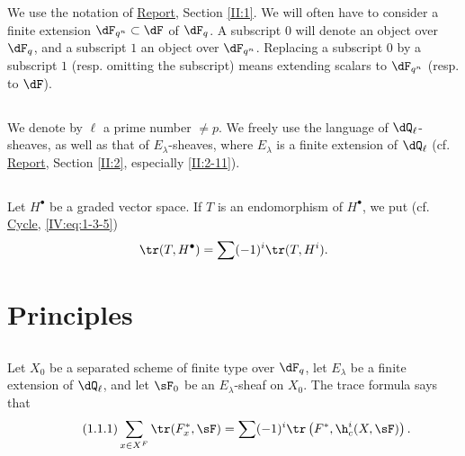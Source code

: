 We use the notation of \hyperref[II]{Report}, Section \ref{II:1}. We 
will often have to consider a finite extension $\dF_{q^n}\subset \dF$ of 
$\dF_q$. A subscript $0$ will denote an object over $\dF_q$, and a subscript $1$ 
an object over $\dF_{q^n}$. Replacing a subscript $0$ by a subscript $1$ (resp. 
omitting the subscript) means extending scalars to $\dF_{q^n}$ (resp. 
to $\dF$).





\subsection{}\label{VI:0-2}

We denote by $\ell$ a prime number $\ne p$. We freely use the 
language of $\dQ_\ell$-sheaves, as well as that of $E_\lambda$-sheaves, 
where $E_\lambda$ is a finite extension of $\dQ_\ell$ (cf. \hyperref[II]{Report}, 
Section \ref{II:2}, especially \ref{II:2-11}). 





\subsection{}\label{VI:0-3}

Let $H^\bullet$ be a graded vector space. If $T$ is an endomorphism of 
$H^\bullet$, we put (cf. \hyperref[IV]{Cycle}, \ref{IV:eq:1-3-5}) 
\[
  \tr(T,H^\bullet) = \sum (-1)^i \tr(T,H^i) \text{.}
\]










\section{Principles}\label{VI:1}





\subsection{}\label{VI:1-1}

Let $X_0$ be a separated scheme of finite type over $\dF_q$, let $E_\lambda$ be a 
finite extension of $\dQ_\ell$, and let $\sF_0$ be an $E_\lambda$-sheaf on $X_0$. The 
trace formula says that 
\begin{equation*}\tag{1.1.1}\label{VI:eq:1-1-1}
  \sum_{x\in X^F} \tr(F_x^\ast,\sF) = \sum (-1)^i \tr\left(F^\ast,\h_c^i(X,\sF)\right) \text{.}
\end{equation*}

